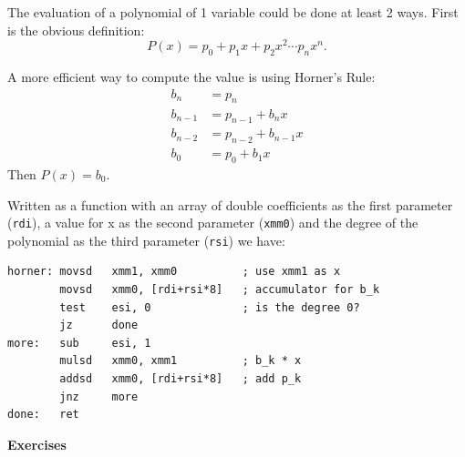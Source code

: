 \documentclass[11pt,b5paper]{book}
\begin{document}
The evaluation of a polynomial of 1 variable could be done at least 2 ways.
First is the obvious definition:
$$P(x) = p_0 + p_1x + p_2x^2 \cdots p_nx^n.$$

A more efficient way to compute the value is using Horner's Rule:
\begin{align*}
    b_n      &= p_n \\
   b_{n-1}   &= p_{n-1} + b_nx \\
   b_{n-2}   &= p_{n-2} + b_{n-1}x \\
    b_0      &= p_0 + b_1x
\end{align*}
Then $P(x) = b_0$.

Written as a function with an array of double coefficients as the first parameter ({\tt rdi}),
a value for x as the second parameter ({\tt xmm0})
and the degree of the polynomial as the third parameter ({\tt rsi}) we have:
\begin{verbatim}
horner: movsd   xmm1, xmm0          ; use xmm1 as x
        movsd   xmm0, [rdi+rsi*8]   ; accumulator for b_k
        test    esi, 0              ; is the degree 0?
        jz      done
more:   sub     esi, 1
        mulsd   xmm0, xmm1          ; b_k * x
        addsd   xmm0, [rdi+rsi*8]   ; add p_k
        jnz     more
done:   ret
\end{verbatim}




\vfill
\break
{\bf\large Exercises}
\end{document}
